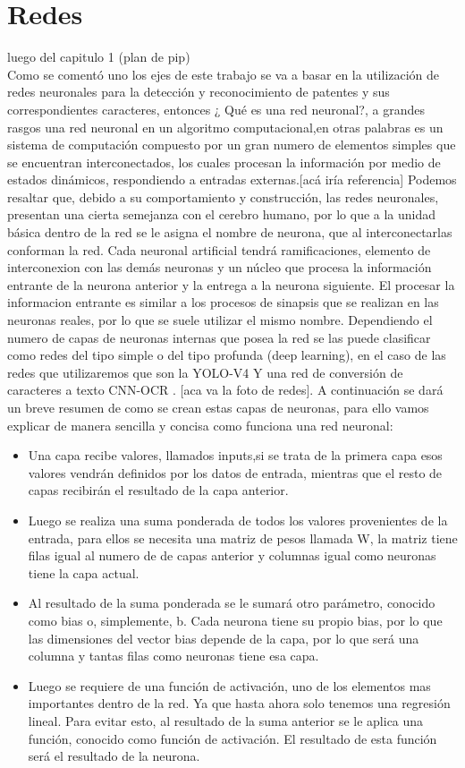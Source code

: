 \section{Redes}

luego del capitulo 1 (plan de pip)\\

Como se comentó uno los ejes de este trabajo se va a basar en la utilización de redes neuronales para la detección y reconocimiento de patentes y sus correspondientes caracteres, entonces ¿ Qué es una red neuronal?, a grandes rasgos una red neuronal en un algoritmo computacional,en otras palabras es un sistema de computación compuesto por un gran numero de elementos simples que se encuentran interconectados, los cuales procesan la información por medio de estados dinámicos, respondiendo a entradas externas.[acá iría referencia]
Podemos resaltar que, debido a su comportamiento y construcción, las redes neuronales, presentan una cierta semejanza con el cerebro humano, por lo que a la unidad básica dentro de la red se le asigna el nombre de neurona, que al interconectarlas conforman la red.
Cada neuronal artificial tendrá ramificaciones, elemento de interconexion con las demás neuronas y un núcleo que procesa la información entrante de la neurona anterior y la entrega a la neurona siguiente. El procesar la informacion entrante es similar a los procesos de sinapsis que se realizan en las neuronas reales, por lo que se suele utilizar el mismo nombre.
Dependiendo el numero de capas de neuronas internas que posea la red se las puede clasificar como redes del tipo simple o del tipo profunda (deep learning), en el caso de las redes que utilizaremos que son la YOLO-V4 Y una red de conversión de caracteres a texto CNN-OCR .
[aca va la foto de redes].
A continuación se dará un breve resumen de como se crean estas capas de neuronas, para ello vamos explicar de manera sencilla y concisa como funciona una red neuronal:
\begin{itemize}
\item Una capa recibe valores, llamados inputs,si se trata de la primera capa esos valores vendrán definidos por los datos de entrada, mientras que el resto de capas recibirán el resultado de la capa anterior.
\item Luego se realiza una suma ponderada de todos los valores provenientes de la entrada, para ellos se necesita una matriz de pesos llamada W, la matriz tiene filas igual al numero de de capas anterior y columnas igual como neuronas tiene la capa actual.
\item Al resultado de la suma ponderada se le sumará otro parámetro, conocido como bias o, simplemente, b. Cada neurona tiene su propio bias, por lo que las dimensiones del vector bias depende de la capa, por lo que será una columna y tantas filas como neuronas tiene esa capa.
\item Luego se requiere de una función de activación, uno de los elementos mas importantes dentro de la red. Ya que hasta ahora solo tenemos una regresión lineal. Para evitar esto, al resultado de la suma anterior se le aplica una función, conocido como función de activación. El resultado de esta función será el resultado de la neurona.
\end{itemize}
